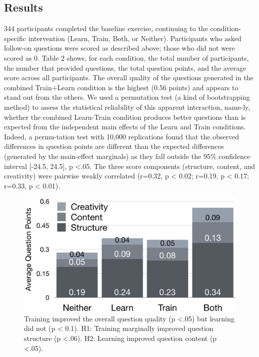 \subsection{Results}
344 participants completed the baseline exercise, continuing to the condition-specific intervention (Learn, Train, Both, or Neither). Participants who asked follow-on questions were scored as described above; those who did not were scored as 0. Table 2 shows, for each condition, the total number of participants, the number that provided questions, the total question points, and the average score across all participants. The overall quality of the questions generated in the combined Train+Learn condition is the highest (0.56 points) and appears to stand out from the others. We used a permutation test (a kind of bootstrapping method) to assess the statistical reliability of this apparent interaction, name-ly, whether the combined Learn-Train condition produces better questions than is expected from the independent main effects of the Learn and Train conditions. Indeed, a permu-tation test with 10,000 replications found that the observed differences in question points are different than the expected differences (generated by the main-effect marginals) as they fall outside the 95\% confidence interval [-24.5, 24.5], p <.05. The three score components (structure, content, and creativity) were pairwise weakly correlated (r=0.32, p < 0.02; r=0.19, p < 0.17; r=0.33, p < 0.01). 


\begin{figure}[h] 
  \centering
  \includegraphics[width=1.0\textwidth]{figures/docent/fig-5.png}
  \caption[]
{Training improved the overall question quality (p <.05) but learning did not (p < 0.1). H1: Training marginally improved question structure (p <.06). H2: Learning improved question content (p <.05).}
  \label{fig:docent-5}
\end{figure}

